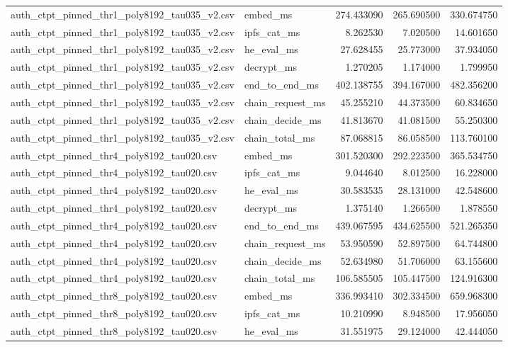 \begin{tabular}{llrrr}
auth_ctpt_pinned_thr1_poly8192_tau035_v2.csv & embed_ms & 274.433090 & 265.690500 & 330.674750 \\
auth_ctpt_pinned_thr1_poly8192_tau035_v2.csv & ipfs_cat_ms & 8.262530 & 7.020500 & 14.601650 \\
auth_ctpt_pinned_thr1_poly8192_tau035_v2.csv & he_eval_ms & 27.628455 & 25.773000 & 37.934050 \\
auth_ctpt_pinned_thr1_poly8192_tau035_v2.csv & decrypt_ms & 1.270205 & 1.174000 & 1.799950 \\
auth_ctpt_pinned_thr1_poly8192_tau035_v2.csv & end_to_end_ms & 402.138755 & 394.167000 & 482.356200 \\
auth_ctpt_pinned_thr1_poly8192_tau035_v2.csv & chain_request_ms & 45.255210 & 44.373500 & 60.834650 \\
auth_ctpt_pinned_thr1_poly8192_tau035_v2.csv & chain_decide_ms & 41.813670 & 41.081500 & 55.250300 \\
auth_ctpt_pinned_thr1_poly8192_tau035_v2.csv & chain_total_ms & 87.068815 & 86.058500 & 113.760100 \\
auth_ctpt_pinned_thr4_poly8192_tau020.csv & embed_ms & 301.520300 & 292.223500 & 365.534750 \\
auth_ctpt_pinned_thr4_poly8192_tau020.csv & ipfs_cat_ms & 9.044640 & 8.012500 & 16.228000 \\
auth_ctpt_pinned_thr4_poly8192_tau020.csv & he_eval_ms & 30.583535 & 28.131000 & 42.548600 \\
auth_ctpt_pinned_thr4_poly8192_tau020.csv & decrypt_ms & 1.375140 & 1.266500 & 1.878550 \\
auth_ctpt_pinned_thr4_poly8192_tau020.csv & end_to_end_ms & 439.067595 & 434.625500 & 521.265350 \\
auth_ctpt_pinned_thr4_poly8192_tau020.csv & chain_request_ms & 53.950590 & 52.897500 & 64.744800 \\
auth_ctpt_pinned_thr4_poly8192_tau020.csv & chain_decide_ms & 52.634980 & 51.706000 & 63.155600 \\
auth_ctpt_pinned_thr4_poly8192_tau020.csv & chain_total_ms & 106.585505 & 105.447500 & 124.916300 \\
auth_ctpt_pinned_thr8_poly8192_tau020.csv & embed_ms & 336.993410 & 302.334500 & 659.968300 \\
auth_ctpt_pinned_thr8_poly8192_tau020.csv & ipfs_cat_ms & 10.210990 & 8.948500 & 17.956050 \\
auth_ctpt_pinned_thr8_poly8192_tau020.csv & he_eval_ms & 31.551975 & 29.124000 & 42.444050 \\

\end{tabular}
